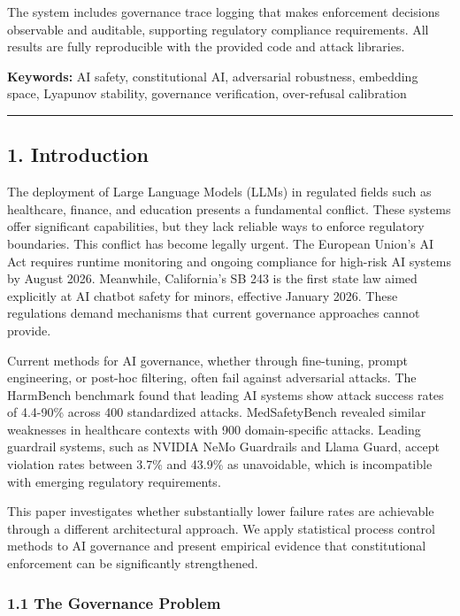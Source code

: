 The system includes governance trace logging that makes enforcement
decisions observable and auditable, supporting regulatory compliance
requirements. All results are fully reproducible with the provided code
and attack libraries.

\textbf{Keywords:} AI safety, constitutional AI, adversarial robustness,
embedding space, Lyapunov stability, governance verification,
over-refusal calibration

\begin{center}\rule{0.5\linewidth}{0.5pt}\end{center}

\subsection{1. Introduction}\label{introduction}

The deployment of Large Language Models (LLMs) in regulated fields such
as healthcare, finance, and education presents a fundamental conflict.
These systems offer significant capabilities, but they lack reliable
ways to enforce regulatory boundaries. This conflict has become legally
urgent. The European Union's AI Act requires runtime monitoring and
ongoing compliance for high-risk AI systems by August 2026. Meanwhile,
California's SB 243 is the first state law aimed explicitly at AI
chatbot safety for minors, effective January 2026. These regulations
demand mechanisms that current governance approaches cannot provide.

Current methods for AI governance, whether through fine-tuning, prompt
engineering, or post-hoc filtering, often fail against adversarial
attacks. The HarmBench benchmark found that leading AI systems show
attack success rates of 4.4-90\% across 400 standardized attacks.
MedSafetyBench revealed similar weaknesses in healthcare contexts with
900 domain-specific attacks. Leading guardrail systems, such as NVIDIA
NeMo Guardrails and Llama Guard, accept violation rates between 3.7\%
and 43.9\% as unavoidable, which is incompatible with emerging
regulatory requirements.

This paper investigates whether substantially lower failure rates are
achievable through a different architectural approach. We apply
statistical process control methods to AI governance and present
empirical evidence that constitutional enforcement can be significantly
strengthened.

\subsubsection{1.1 The Governance Problem}\label{the-governance-problem}

